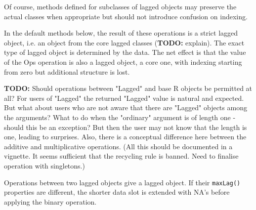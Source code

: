 \documentclass[11pt,a4paper]{article}
\begin{document}
Of course, methods defined for subclasses of lagged objects may preserve the actual classes
when appropriate but should not introduce confusion on indexing.

In the default methods below, the result of these operations is a strict lagged object,
i.e. an object from the core lagged classes (\textbf{TODO:} explain). The exact type of lagged
object is determined by the data. The net effect is that the value of the Ops operation is
also a lagged object, a core one, with indexing starting from zero but additional structure
is lost.


\textbf{TODO:} Should operations between "Lagged" and base R objects be permitted at all?  For users
of "Lagged" the returned "Lagged" value is natural and expected. But what about users who are
not aware that there are "Lagged" objects among the arguments? What to do when the "ordinary"
argument is of length one - should this be an exception? But then the user may not know that
the length is one, leading to surprises. Also, there is a conceptual difference here between
the additive and multiplicative operations. (All this should be documented in a vignette. It
seems sufficient that the recycling rule is banned. Need to finalise operation with
singletons.)


Operations between two lagged objects give a lagged object. If their \texttt{maxLag()} properties
are different, the shorter data slot is extended with NA's before applying the binary
operation.
\end{document}
